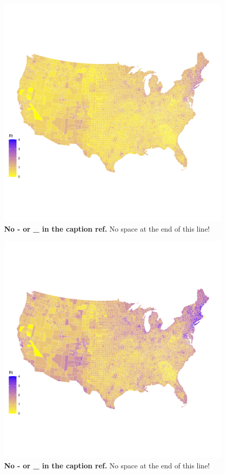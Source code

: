 \documentclass[
  12pt,
]{article}
\begin{document}
\begin{figure}[H]

{\centering \includegraphics{Final-Manuscript_files/figure-latex/fig3-1} 

}

\caption{\textbf{No - or \_ in the caption ref.} No space at the end of this line!}\label{fig:fig3}
\end{figure}



\begin{figure}[H]

{\centering \includegraphics{Final-Manuscript_files/figure-latex/fig4-1} 

}

\caption{\textbf{No - or \_ in the caption ref.} No space at the end of this line!}\label{fig:fig4}
\end{figure}
\end{document}
